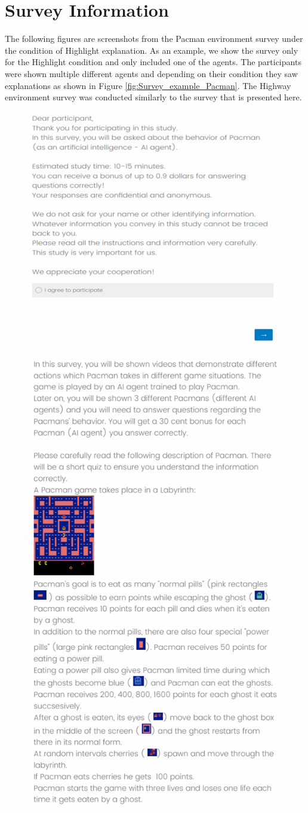 \section{Survey Information}
\label{ap:survey_information}
The following figures are screenshots from the Pacman environment survey under the condition of Highlight explanation.
As an example, we show the survey only for the Highlight condition and only included one of the agents.
The participants were shown multiple different agents and depending on their condition they saw explanations as shown in Figure \ref{fig:Survey_example_Pacman}.
The Highway environment survey was conducted similarly to the survey that is presented here.

\begin{figure}[]
\centering
\includegraphics[width=0.7\linewidth]{consent.png}
\end{figure}
\begin{figure}[t]
\centering
\includegraphics[width=0.7\linewidth]{pacman_domain.png}
\end{figure}
